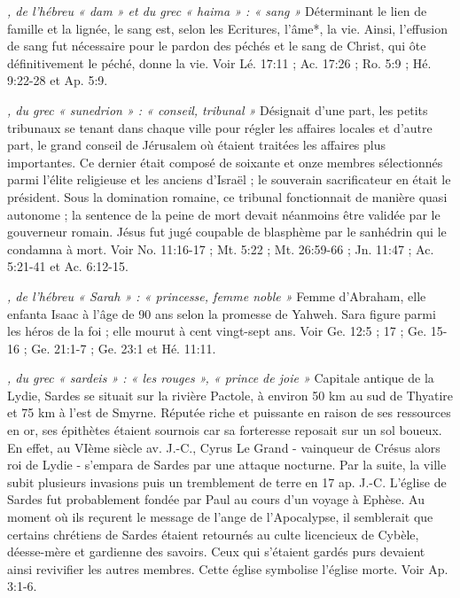 \begin{multicols}{2}
{\textit{, de l'hébreu « dam » et du grec « haima » : « sang »}\newline
Déterminant le lien de famille et la lignée, le sang est, selon les Ecritures, l'âme*, la vie. Ainsi, l'effusion de sang fut nécessaire pour le pardon des péchés et le sang de Christ, qui ôte définitivement le péché, donne la vie. Voir Lé. 17:11 ; Ac. 17:26 ; Ro. 5:9 ; Hé. 9:22-28 et Ap. 5:9.

\textit{, du grec « sunedrion » : « conseil, tribunal »}\newline
Désignait d'une part, les petits tribunaux se tenant dans chaque ville pour régler les affaires locales et d'autre part, le grand conseil de Jérusalem où étaient traitées les affaires plus importantes. Ce dernier était composé de soixante et onze membres sélectionnés parmi l'élite religieuse et les anciens d'Israël ; le souverain sacrificateur en était le président. Sous la domination romaine, ce tribunal fonctionnait de manière quasi autonome ; la sentence de la peine de mort devait néanmoins être validée par le gouverneur romain. Jésus fut jugé coupable de blasphème par le sanhédrin qui le condamna à mort. Voir No. 11:16-17 ; Mt. 5:22 ; Mt. 26:59-66 ; Jn. 11:47 ; Ac. 5:21-41 et Ac. 6:12-15.

\textit{, de l'hébreu « Sarah » : « princesse, femme noble »}\newline
Femme d'Abraham, elle enfanta Isaac à l'âge de 90 ans selon la promesse de Yahweh. Sara figure parmi les héros de la foi ; elle mourut à cent vingt-sept ans. Voir Ge. 12:5 ; 17 ; Ge. 15-16 ; Ge. 21:1-7 ; Ge. 23:1 et Hé. 11:11.

\textit{, du grec « sardeis » : « les rouges », « prince de joie »}\newline
Capitale antique de la Lydie, Sardes se situait sur la rivière Pactole, à environ 50 km au sud de Thyatire et 75 km à l'est de Smyrne. Réputée riche et puissante en raison de ses ressources en or, ses épithètes étaient sournois car sa forteresse reposait sur un sol boueux. En effet, au VIème siècle av. J.-C., Cyrus Le Grand - vainqueur de Crésus alors roi de Lydie - s'empara de Sardes par une attaque nocturne. Par la suite, la ville subit plusieurs invasions puis un tremblement de terre en 17 ap. J.-C. L'église de Sardes fut probablement fondée par Paul au cours d'un voyage à Ephèse. Au moment où ils reçurent le message de l'ange de l'Apocalypse, il semblerait que certains chrétiens de Sardes étaient retournés au culte licencieux de Cybèle, déesse-mère et gardienne des savoirs. Ceux qui s'étaient gardés purs devaient ainsi revivifier les autres membres. Cette église symbolise l'église morte. Voir Ap. 3:1-6.

}
\end{multicols}
